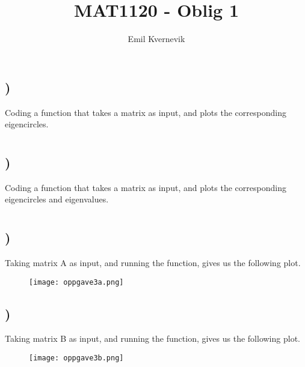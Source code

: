 \documentclass[a4paper,10pt,norsk]{article}
\title{MAT1120 - Oblig 1}
\author{Emil Kvernevik}
\begin{document}
\maketitle

\section{}

\subsection{)}
Coding a function that takes a matrix as input, and plots the corresponding eigencircles.


\section{}

\subsection{)}
Coding a function that takes a matrix as input, and plots the corresponding eigencircles and eigenvalues.


\section{}
\subsection{)}
Taking matrix A as input, and running the function, gives us the following plot.
\begin{figure}[h!]
        \centering 
        \texttt{[image: oppgave3a.png]} 
\end{figure}

\subsection{)}
Taking matrix B as input, and running the function, gives us the following plot.

\begin{figure}[h!]
        \centering 
        \texttt{[image: oppgave3b.png]} 
\end{figure}

\end{document}
